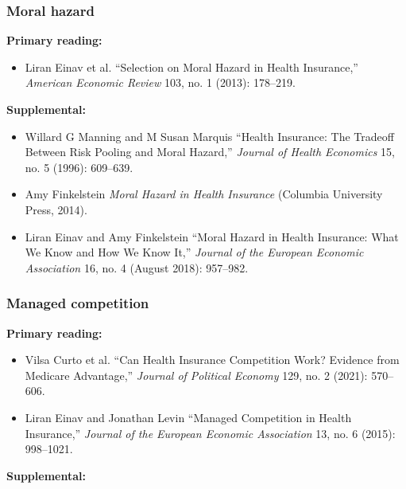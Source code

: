 \documentclass[11pt,]{article}
\providecommand{\tightlist}{%
  \setlength{\itemsep}{0pt}\setlength{\parskip}{0pt}}
\begin{document}
\hypertarget{moral-hazard}{%
\subsubsection{Moral hazard}\label{moral-hazard}}

\textbf{Primary reading:}

\begin{itemize}
\tightlist
\item
  Liran Einav et al. {``Selection on Moral Hazard in Health
  Insurance,''} \emph{American Economic Review} 103, no. 1 (2013):
  178--219.
\end{itemize}

\textbf{Supplemental:}

\begin{itemize}
\tightlist
\item
  Willard G Manning and M Susan Marquis {``Health Insurance: The
  Tradeoff Between Risk Pooling and Moral Hazard,''} \emph{Journal of
  Health Economics} 15, no. 5 (1996): 609--639.
\item
  Amy Finkelstein \emph{Moral Hazard in Health Insurance} (Columbia
  University Press, 2014).
\item
  Liran Einav and Amy Finkelstein {``Moral {Hazard} in {Health}
  {Insurance}: {What} {We} {Know} and {How} {We} {Know} {It},''}
  \emph{Journal of the European Economic Association} 16, no. 4 (August
  2018): 957--982.
\end{itemize}

\hypertarget{managed-competition}{%
\subsubsection{Managed competition}\label{managed-competition}}

\textbf{Primary reading:}

\begin{itemize}
\tightlist
\item
  Vilsa Curto et al. {``Can {Health} {Insurance} {Competition} {Work}?
  {Evidence} from {Medicare} {Advantage},''} \emph{Journal of Political
  Economy} 129, no. 2 (2021): 570--606.
\item
  Liran Einav and Jonathan Levin {``Managed Competition in Health
  Insurance,''} \emph{Journal of the European Economic Association} 13,
  no. 6 (2015): 998--1021.
\end{itemize}

\textbf{Supplemental:}
\end{document}
